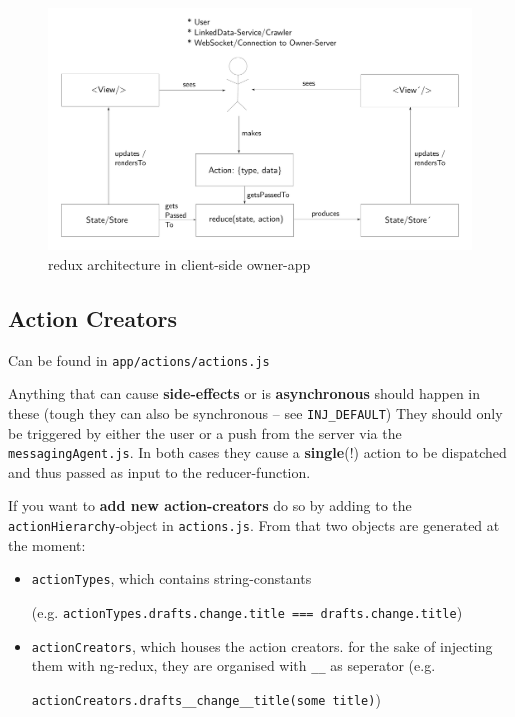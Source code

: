 \begin{figure}
\centering
\includegraphics[width=1.0\textwidth]{figures/owner_app_redux_architecture.pdf}
\caption{\label{fig:adapted-redux}redux architecture in client-side owner-app}
\end{figure}

\subsection{Action Creators}\label{sct:action-creators}

Can be found in \texttt{app/actions/actions.js} %

Anything that can cause \textbf{side-effects} or is
\textbf{asynchronous} should happen in these (tough they can also
be synchronous -- see \texttt{INJ\_DEFAULT}) %
They should only be triggered
by either the user or a push from the server via the
\texttt{messagingAgent.js}. In both cases they cause a
\textbf{single}(!) action to be dispatched and thus passed as
input to the reducer-function.

If you want to \textbf{add new action-creators} do so by adding to the
\texttt{actionHierarchy}-object in \texttt{actions.js}. %
From that two objects are generated at the moment:

\begin{itemize}
\tightlist
\item
  \texttt{actionTypes}, which contains string-constants

  (e.g.
  \texttt{actionTypes.drafts.change.title\ ===\
  \textquotesingle{}drafts.change.title\textquotesingle{}})
\item
  \texttt{actionCreators}, which houses the action creators. for the
  sake of injecting them with ng-redux, they are organised with
  \texttt{\_\_} as seperator (e.g.

  \texttt{actionCreators.drafts\_\_change\_\_title(\textquotesingle{}some\ title\textquotesingle{})})
\end{itemize}


